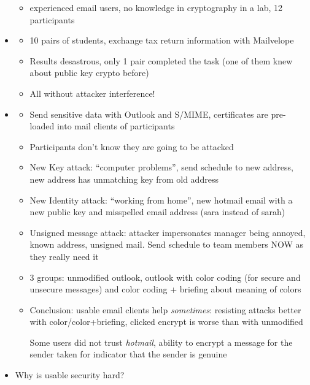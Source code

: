 \documentclass[a4paper,12pt]{scrartcl}
\begin{document}
\begin{itemize}
\begin{itemize}
			\item
				experienced email users, no knowledge in cryptography in a lab, 12 participants
		\end{itemize}
	\item
		\begin{itemize}
			\item
				10 pairs of students, exchange tax return information with Mailvelope
			\item
				Results desastrous, only 1 pair completed the task (one of them knew about public key crypto before)
			\item
				All without attacker interference!
		\end{itemize}
	\item
		\begin{itemize}
			\item
				Send sensitive data with Outlook and S/MIME, certificates are pre-loaded into mail clients of participants
			\item
				Participants don't know they are going to be attacked
			\item
				New Key attack: \enquote{computer problems}, send schedule to new address, new address has unmatching key from old address
			\item
				New Identity attack: \enquote{working from home}, new hotmail email with a new public key and misspelled email address (sara instead of sarah)
			\item
				Unsigned message attack: attacker impersonates manager being annoyed, known address, unsigned mail. Send schedule to team members NOW as they really need it
			\item
				3 groups: unmodified outlook, outlook with color coding (for secure and unsecure messages) and color coding + briefing about meaning of colors
			\item
				Conclusion: usable email clients help \textit{sometimes}: resisting attacks better with color/color+briefing, clicked encrypt is worse than with unmodified

				Some users did not trust \textit{hotmail}, ability to encrypt a message for the sender taken for indicator that the sender is genuine
		\end{itemize}
	\item
		Why is usable security hard?


\end{itemize}
\end{document}
